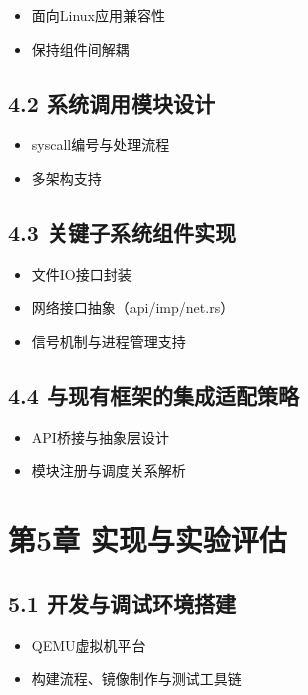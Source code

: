 \documentclass{article}
\begin{document}
\begin{itemize}
    \item 面向Linux应用兼容性
    \item 保持组件间解耦
\end{itemize}

\subsection{4.2 系统调用模块设计}

\begin{itemize}
    \item syscall编号与处理流程
    \item 多架构支持
\end{itemize}

\subsection{4.3 关键子系统组件实现}

\begin{itemize}
    \item 文件IO接口封装
    \item 网络接口抽象（api/imp/net.rs）
    \item 信号机制与进程管理支持
\end{itemize}

\subsection{4.4 与现有框架的集成适配策略}

\begin{itemize}
    \item API桥接与抽象层设计
    \item 模块注册与调度关系解析
\end{itemize}

\section{第5章 实现与实验评估}

\subsection{5.1 开发与调试环境搭建}

\begin{itemize}
    \item QEMU虚拟机平台
    \item 构建流程、镜像制作与测试工具链
\end{itemize}
\end{document}
